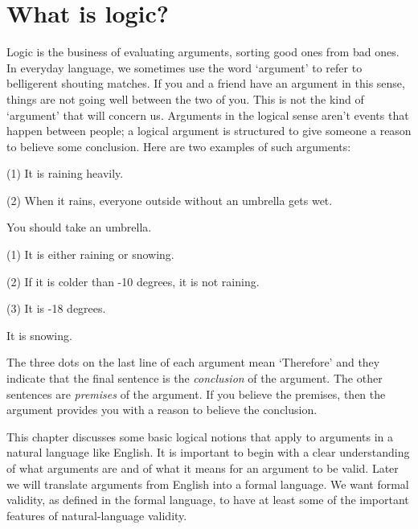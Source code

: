 \chapter{What is logic?}
\label{ch.intro}

Logic is the business of evaluating arguments, sorting good ones from bad ones. In everyday language, we sometimes use the word `argument' to refer to belligerent shouting matches. If you and a friend have an argument in this sense, things are not going well between the two of you. This is not the kind of `argument' that will concern us. Arguments in the logical sense aren't events that happen between people; a logical argument is structured to give someone a reason to believe some conclusion. Here are two examples of such arguments:

\label{argRaining}
\begin{earg}
\item[(1)] It is raining heavily.
\item[(2)] When it rains, everyone outside without an umbrella gets wet.
\item[\therefore] You should take an umbrella.
\end{earg}


\label{argSnowing}
\begin{earg}
\item[(1)] It is either raining or snowing.
\item[(2)] If it is colder than -10 degrees, it is not raining.
\item[(3)] It is -18 degrees.
\item[\therefore] It is snowing.
\end{earg}
 
The three dots on the last line of each argument mean `Therefore' and they indicate that the final sentence is the \textsl{conclusion} of the argument. The other sentences are \textsl{premises} of the argument. If you believe the premises, then the argument provides you with a reason to believe the conclusion.

This chapter discusses some basic logical notions that apply to arguments in a natural language like English. It is important to begin with a clear understanding of what arguments are and of what it means for an argument to be valid. Later we will translate arguments from English into a formal language. We want formal validity, as defined in the formal language, to have at least some of the important features of natural-language validity.

